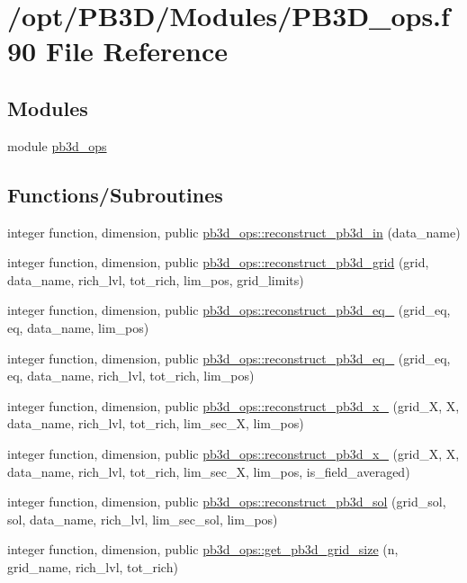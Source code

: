 \hypertarget{PB3D__ops_8f90}{}\section{/opt/\+P\+B3\+D/\+Modules/\+P\+B3\+D\+\_\+ops.f90 File Reference}
\label{PB3D__ops_8f90}
\subsection*{Modules}
\begin{DoxyCompactItemize}
\item 
module \hyperlink{namespacepb3d__ops}{pb3d\+\_\+ops}
\end{DoxyCompactItemize}
\subsection*{Functions/\+Subroutines}
\begin{DoxyCompactItemize}
\item 
integer function, dimension, public \hyperlink{namespacepb3d__ops_a057fc02a2d90e9ac8a7e5764d83fd1df}{pb3d\+\_\+ops\+::reconstruct\+\_\+pb3d\+\_\+in} (data\+\_\+name)
\item 
integer function, dimension, public \hyperlink{namespacepb3d__ops_a279af758fa95e678f6485c50e5bc4ffb}{pb3d\+\_\+ops\+::reconstruct\+\_\+pb3d\+\_\+grid} (grid, data\+\_\+name, rich\+\_\+lvl, tot\+\_\+rich, lim\+\_\+pos, grid\+\_\+limits)
\item 
integer function, dimension, public \hyperlink{namespacepb3d__ops_a248d51dc98b7de287499ba3a4e6c1eaa}{pb3d\+\_\+ops\+::reconstruct\+\_\+pb3d\+\_\+eq\+\_} (grid\+\_\+eq, eq, data\+\_\+name, lim\+\_\+pos)
\item 
integer function, dimension, public \hyperlink{namespacepb3d__ops_a13280910f320a6835cd19e62fe238240}{pb3d\+\_\+ops\+::reconstruct\+\_\+pb3d\+\_\+eq\+\_} (grid\+\_\+eq, eq, data\+\_\+name, rich\+\_\+lvl, tot\+\_\+rich, lim\+\_\+pos)
\item 
integer function, dimension, public \hyperlink{namespacepb3d__ops_ababe805fcaaca1486c74ad7a8aecfb7e}{pb3d\+\_\+ops\+::reconstruct\+\_\+pb3d\+\_\+x\+\_} (grid\+\_\+X, X, data\+\_\+name, rich\+\_\+lvl, tot\+\_\+rich, lim\+\_\+sec\+\_\+X, lim\+\_\+pos)
\item 
integer function, dimension, public \hyperlink{namespacepb3d__ops_a50f211992fbe20a56749b2be81a521e6}{pb3d\+\_\+ops\+::reconstruct\+\_\+pb3d\+\_\+x\+\_} (grid\+\_\+X, X, data\+\_\+name, rich\+\_\+lvl, tot\+\_\+rich, lim\+\_\+sec\+\_\+X, lim\+\_\+pos, is\+\_\+field\+\_\+averaged)
\item 
integer function, dimension, public \hyperlink{namespacepb3d__ops_a418960ddc3c8c0ec6ac0af970feedbe2}{pb3d\+\_\+ops\+::reconstruct\+\_\+pb3d\+\_\+sol} (grid\+\_\+sol, sol, data\+\_\+name, rich\+\_\+lvl, lim\+\_\+sec\+\_\+sol, lim\+\_\+pos)
\item 
integer function, dimension, public \hyperlink{namespacepb3d__ops_a0bd4c4c24d7cbd1494b31ea993946433}{pb3d\+\_\+ops\+::get\+\_\+pb3d\+\_\+grid\+\_\+size} (n, grid\+\_\+name, rich\+\_\+lvl, tot\+\_\+rich)
\end{DoxyCompactItemize}
